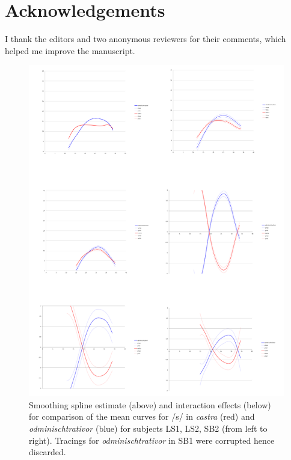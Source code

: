 \documentclass[output=paper]{LSP/langsci}
\begin{document}
\section*{Acknowledgements} 
I thank the editors and two anonymous reviewers for their comments, which helped me improve the manuscript.
\begin{figure}[b!]
\includegraphics[width=.85\textwidth,trim=0 20 0 0, clip]{illustrations/sprea_fig5_collage}
\caption{Smoothing spline estimate (above) and interaction effects (below) for comparison of the mean curves for /s/ in \textit{castra} (red) and \textit{odminischtrativor} (blue) for subjects LS1, LS2, SB2 (from left to right). Tracings for \textit{odminischtrativor} in SB1 were corrupted hence discarded.}
\label{fig:sprea:5}  
\end{figure}
\clearpage

\printbibliography[heading=subbibliography,notkeyword=this]
\end{document}

